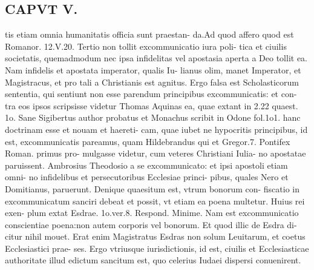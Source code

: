 \documentclass{article}
\begin{document}
\begin{pages}
\section*{CAPVT  V. }
\marginpar{[ p.40 ]}\pstart tis etiam omnia humanitatis officia sunt praestan- da.Ad quod affero quod est Romanor. 12.V.20. Tertio non tollit excommunicatio iura poli- tica et ciuilis societatis, quemadmodum nec ipsa infidelitas vel apostasia aperta a Deo tollit ea. Nam infidelis et apostata imperator, qualis Iu- lianus olim, manet Imperator, et Magistracus, et pro tali a Christianis est agnitus. Ergo falsa est Scholasticorum sententia, qui sentiunt non esse parendum principibus excommunicatis: et con- tra eos ipsos scripsisse videtur Thomas Aquinas ea, quae extant in 2.22 quaest. 1o. Sane Sigibertus author probatus et Monachus scribit in Odone fol.1o1. hanc doctrinam esse et nouam et haereti- cam, quae iubet ne hypocritis principibus, id est, excommunicatis pareamus, quam Hildebrandus qui et Gregor.7. Pontifex Roman. primus pro- mulgasse videtur, cum veteres Christiani Iulia- no apostatae paruissent. Ambrosius Theodosio a se excommunicato: et ipsi apostoli etiam omni- no infidelibus et persecutoribus Ecclesiae princi- pibus, quales Nero et Domitianus, paruerunt. Denique quaesitum est, vtrum bonorum con- fiscatio in excommunicatum sanciri debeat et possit, vt etiam ea poena multetur. Huius rei exen- plum extat Esdrae. 1o.ver.8. Respond. Minime. Nam est excommunicatio conscientiae poena:non autem corporis vel bonorum. Et quod illic de Esdra di- citur nihil mouet. Erat enim Magistratus Esdras non solum Leuitarum, et coetus Ecclesiastici prae- ses. Ergo vtriusque iurisdictionis, id est, ciuilis et Ecclesiasticae authoritate illud edictum sancitum est, quo celerius Iudaei dispersi conuenirent.  \pend

\end{pages}
\end{document}
